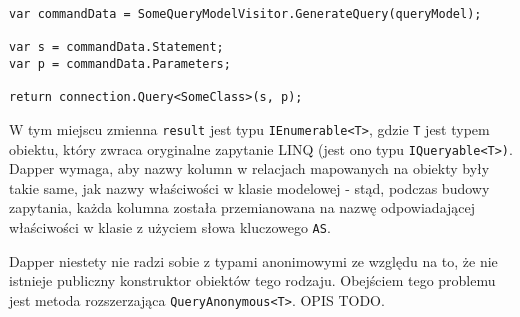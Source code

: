 \begin{lstlisting}
var commandData = SomeQueryModelVisitor.GenerateQuery(queryModel);

var s = commandData.Statement;
var p = commandData.Parameters;

return connection.Query<SomeClass>(s, p);
\end{lstlisting}

W tym miejscu zmienna \texttt{result} jest typu \texttt{IEnumerable<T>}, gdzie \texttt{T} jest typem obiektu, który zwraca oryginalne zapytanie LINQ (jest ono typu \texttt{IQueryable<T>)}. Dapper wymaga, aby nazwy kolumn w relacjach mapowanych na obiekty były takie same, jak nazwy właściwości w klasie modelowej - stąd, podczas budowy zapytania, każda kolumna została przemianowana na nazwę odpowiadającej właściwości w klasie z użyciem słowa kluczowego \texttt{AS}.

Dapper niestety nie radzi sobie z typami anonimowymi ze względu na to, że nie istnieje publiczny konstruktor obiektów tego rodzaju. Obejściem tego problemu jest metoda rozszerzająca \texttt{QueryAnonymous<T>}. OPIS TODO.